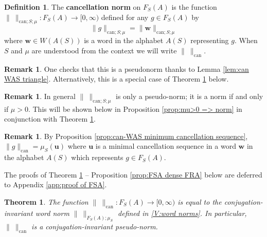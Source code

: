 \documentclass[12pt]{amsart}
\newtheorem{theorem}[prop]{Theorem}
\theoremstyle{definition}
\newtheorem{defn}[prop]{Definition}
\newtheorem{remark}[prop]{Remark}
\newcommand{\B}[1]{\mathbf{#1}}
\def\can{\text{can}}
\def\Free{F}
\begin{document}
\begin{defn}\label{defn:can norm of FSA}
The {\bf cancellation  norm} on $\Free_S(A)$ is the function $\| \ \|_{\can;S;\mu} \colon \Free_S(A) \to [0,\infty)$ defined for any $g \in \Free_S(A)$ by
\[
\|g\|_{\can;S;\mu} = \| \B w\|_{\can;S;\mu}
\]
where $\B w \in W(A(S))$ is a word in the alphabet $A(S)$  representing $g$.
When $S$ and $\mu$ are understood from the context we will write $\| \ \|_{\can}$.
\end{defn}


\begin{remark}
One checks that this is a pseudonorm thanks to Lemma \ref{lem:can WAS triangle}.
Alternatively, this is a special case of Theorem \ref{thm:FSA cancellation=CIWN} below.
\end{remark}


\begin{remark}
In general $\| \ \|_{\can;S;\mu}$ is only a pseudo-norm; it is a norm if and only if $\mu>0$.
This will be shown below in Proposition \ref{prop:mu>0 => norm} in conjunction with Theorem \ref{thm:FSA cancellation=CIWN}.
\end{remark}


\begin{remark}
By Proposition \ref{prop:can-WAS minimum cancellation sequence}, $\|g\|_{\can}=\mu_S(\B u)$ where $\B u$ is a minimal cancellation sequence in a word $\B w$ in the alphabet $A(S)$ which represents $g \in \Free_S(A)$.
\end{remark}



The proofs of Theorem \ref{thm:FSA cancellation=CIWN} -- Proposition \ref{prop:FSA dense FRA} below are deferred to Appendix \ref{app:proof of FSA}.


\begin{theorem}\label{thm:FSA cancellation=CIWN}
The function $\| \ \|_{\can} \colon \Free_S(A) \to [0,\infty)$ is equal to the conjugation-invariant word norm $\| \ \|_{\Free_S(A);\mu_S}$ defined in \ref{V:word norms}.
In particular, $\| \ \|_{\can}$ is a conjugation-invariant pseudo-norm.
\end{theorem}

\end{document}
